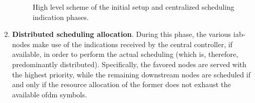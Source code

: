 \begin{enumerate}
\begin{figure}[tbp]
	\centering
  	\hfill
    \caption{High level scheme of the initial setup and centralized scheduling indication phases.}
    \label{Fig:Phases}
\end{figure}


\item \textbf{Distributed scheduling allocation}. During this phase, the various \gls{iab}-nodes make use of the indications received by the central controller, if available, in order to perform the actual scheduling (which is, therefore, predominantly distributed). Specifically, the favored nodes are served with the highest priority, while the remaining downstream nodes are scheduled if and only if the resource allocation of the former does not exhaust the available \gls{ofdm} symbols.
\end{enumerate}
